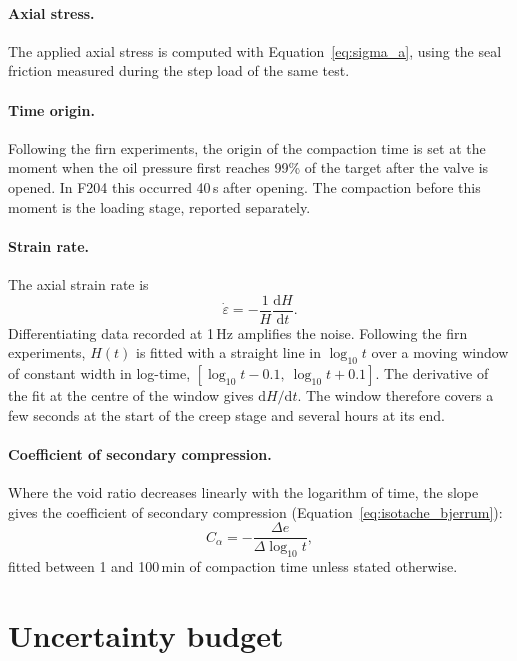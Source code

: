 \paragraph{Axial stress.} The applied axial stress is computed with Equation~\eqref{eq:sigma_a}, using the seal friction measured during the step load of the same test.

\paragraph{Time origin.} Following the firn experiments, the origin of the compaction time is set at the moment when the oil pressure first reaches 99\% of the target after the valve is opened. In F204 this occurred 40\,s after opening. The compaction before this moment is the loading stage, reported separately.

\paragraph{Strain rate.} The axial strain rate is
\begin{equation}
    \dot\varepsilon = -\frac{1}{H}\frac{\mathrm{d}H}{\mathrm{d}t}.
    \label{eq:strain_rate}
\end{equation}
Differentiating data recorded at 1\,Hz amplifies the noise. Following the firn experiments, $H(t)$ is fitted with a straight line in $\log_{10} t$ over a moving window of constant width in log-time, $[\log_{10}t - 0.1,\ \log_{10}t + 0.1]$. The derivative of the fit at the centre of the window gives $\mathrm{d}H/\mathrm{d}t$. The window therefore covers a few seconds at the start of the creep stage and several hours at its end.

\paragraph{Coefficient of secondary compression.} Where the void ratio decreases linearly with the logarithm of time, the slope gives the coefficient of secondary compression (Equation~\eqref{eq:isotache_bjerrum}):
\begin{equation}
    C_\alpha = -\frac{\Delta e}{\Delta\log_{10}t},
    \label{eq:calpha}
\end{equation}
fitted between 1 and 100\,min of compaction time unless stated otherwise.

\section{Uncertainty budget}
\label{sec:uncertainty}

